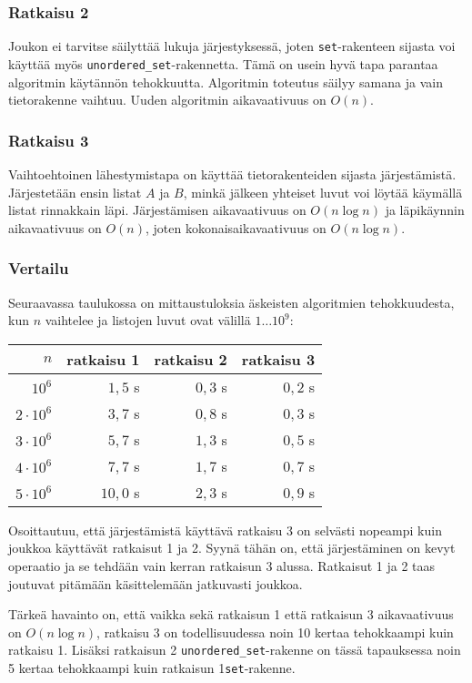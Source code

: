 \subsubsection{Ratkaisu 2}

Joukon ei tarvitse säilyttää lukuja
järjestyksessä, joten
\texttt{set}-ra\-ken\-teen sijasta voi
käyttää myös \texttt{unordered\_set}-ra\-ken\-net\-ta.
Tämä on usein hyvä tapa parantaa algoritmin
käytännön tehokkuutta.
Algoritmin toteutus säilyy samana ja vain tietorakenne vaihtuu.
Uuden algoritmin aikavaativuus on $O(n)$.

\subsubsection{Ratkaisu 3}

Vaihtoehtoinen lähestymistapa on käyttää tietorakenteiden
sijasta järjestämistä.
Järjestetään ensin listat $A$ ja $B$,
minkä jälkeen yhteiset luvut voi löytää
käymällä listat rinnakkain läpi.
Järjestämisen aikavaativuus on $O(n \log n)$ ja
läpikäynnin aikavaativuus on $O(n)$,
joten kokonaisaikavaativuus on $O(n \log n)$.

\subsubsection{Vertailu}

Seuraavassa taulukossa on mittaustuloksia
äskeisten algoritmien tehokkuudesta,
kun $n$ vaihtelee ja listojen luvut ovat välillä $1 \ldots 10^9$:

\begin{center}
\begin{tabular}{rrrr}
$n$ & ratkaisu 1 & ratkaisu 2 & ratkaisu 3 \\
\hline
$10^6$ & $1{,}5$ s & $0{,}3$ s & $0{,}2$ s \\
$2 \cdot 10^6$ & $3{,}7$ s & $0{,}8$ s & $0{,}3$ s \\
$3 \cdot 10^6$ & $5{,}7$ s & $1{,}3$ s & $0{,}5$ s \\
$4 \cdot 10^6$ & $7{,}7$ s & $1{,}7$ s & $0{,}7$ s \\
$5 \cdot 10^6$ & $10{,}0$ s & $2{,}3$ s & $0{,}9$ s \\
\end{tabular}
\end{center}

Osoittautuu, että järjestämistä käyttävä ratkaisu 3
on selvästi nopeampi kuin joukkoa käyttävät
ratkaisut 1 ja 2.
Syynä tähän on, että järjestäminen on kevyt operaatio
ja se tehdään vain kerran ratkaisun 3 alussa.
Ratkaisut 1 ja 2 taas joutuvat pitämään
käsittelemään jatkuvasti joukkoa.

Tärkeä havainto on, että vaikka sekä ratkaisun 1
että ratkaisun 3 aikavaativuus on $O(n \log n)$,
ratkaisu 3 on todellisuudessa noin 10 kertaa
tehokkaampi kuin ratkaisu 1.
Lisäksi ratkaisun 2 \texttt{unordered\_set}-rakenne on tässä
tapauksessa noin 5 kertaa tehokkaampi kuin
ratkaisun 1\texttt{set}-rakenne.

